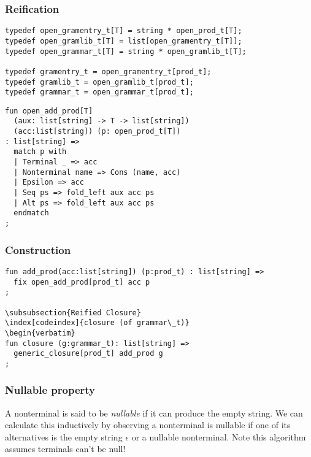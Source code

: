 \documentclass[oneside]{book}
\begin{document}
\subsubsection{Reification}
\begin{verbatim}
typedef open_gramentry_t[T] = string * open_prod_t[T];
typedef open_gramlib_t[T] = list[open_gramentry_t[T]];
typedef open_grammar_t[T] = string * open_gramlib_t[T];

typedef gramentry_t = open_gramentry_t[prod_t];
typedef gramlib_t = open_gramlib_t[prod_t];
typedef grammar_t = open_grammar_t[prod_t];
\end{verbatim}

\begin{verbatim}
fun open_add_prod[T] 
  (aux: list[string] -> T -> list[string])
  (acc:list[string]) (p: open_prod_t[T]) 
: list[string] =>
  match p with
  | Terminal _ => acc
  | Nonterminal name => Cons (name, acc) 
  | Epsilon => acc
  | Seq ps => fold_left aux acc ps
  | Alt ps => fold_left aux acc ps
  endmatch
;
\end{verbatim}

\subsubsection{Construction}
\begin{verbatim}
fun add_prod(acc:list[string]) (p:prod_t) : list[string] =>
  fix open_add_prod[prod_t] acc p
;

\subsubsection{Reified Closure}
\index[codeindex]{closure (of grammar\_t)}
\begin{verbatim}
fun closure (g:grammar_t): list[string] =>
  generic_closure[prod_t] add_prod g
;
\end{verbatim}

\subsubsection{Nullable property}
A nonterminal is said to be {\em nullable} if it can produce
the empty string. We can calculate this inductively by observing
a nonterminal is nullable if one of its alternatives is the empty
string $\epsilon$ or a nullable nonterminal. Note this algorithm
assumes terminals can't be null!
\end{document}

